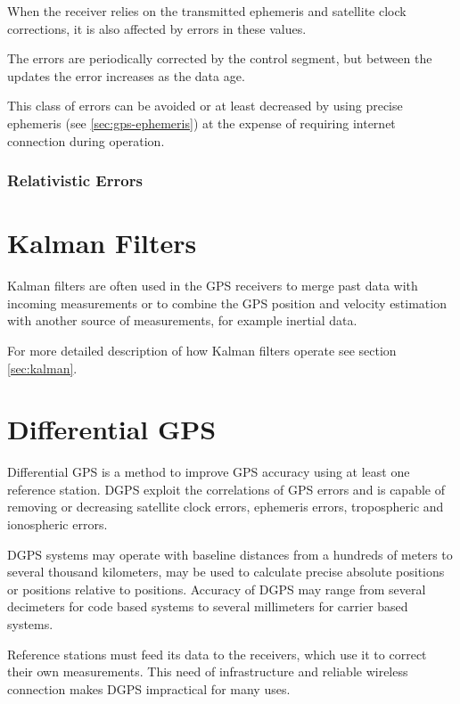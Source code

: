 When the receiver relies on the transmitted ephemeris and satellite clock corrections,
it is also affected by errors in these values.

The errors are periodically corrected by the control segment, but between the updates the error
increases as the data age.

This class of errors can be avoided or at least decreased by using precise ephemeris (see \autoref{sec:gps-ephemeris})
at the expense of requiring internet connection during operation.

\subsubsection{Relativistic Errors}

\section{Kalman Filters}
Kalman filters are often used in the GPS receivers to merge past
data with incoming measurements or to combine the GPS position and velocity
estimation with another source of measurements, for example inertial data.

For more detailed description of how Kalman filters operate see section
\ref{sec:kalman}.

\section{Differential GPS}
\label{sec:dgps}

Differential GPS is a method to improve GPS accuracy using at least one reference station.
DGPS exploit the correlations of GPS errors and is capable of removing or decreasing satellite clock errors,
ephemeris errors, tropospheric and ionospheric errors.

DGPS systems may operate with baseline distances from a hundreds of meters to several thousand kilometers,
may be used to calculate precise absolute positions or positions relative to positions.
Accuracy of DGPS may range from several decimeters for code based systems to several
millimeters for carrier based systems.

Reference stations must feed its data to the receivers, which use it to correct their own measurements.
This need of infrastructure and reliable wireless connection makes DGPS impractical for many uses.


